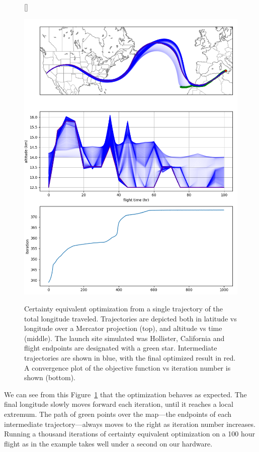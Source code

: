 \documentclass[11pt]{scrartcl} %
\begin{document}
\begin{figure}[h!]
[\FBwidth]
{\caption{Certainty equivalent optimization from a single trajectory of the total longitude traveled. Trajectories are depicted both in latitude vs longitude over a Mercator projection (top), and altitude vs time (middle). The launch site simulated was Hollister, California and flight endpoints are designated with a green star. Intermediate trajectories are shown in blue, with the final optimized result in red. A convergence plot of the objective function vs iteration number is shown (bottom).}\label{ce}}
{\includegraphics[width=1\linewidth]{certaintyeq.png}}
\end{figure}

We can see from this Figure~\ref{ce} that the optimization behaves as expected. The final longitude slowly moves forward each iteration, until it reaches a local extremum. The path of green points over the map---the endpoints of each intermediate trajectory---always moves to the right as iteration number increases. Running a thousand iterations of certainty equivalent optimization on a 100 hour flight as in the example takes well under a second on our hardware.
\end{document}
